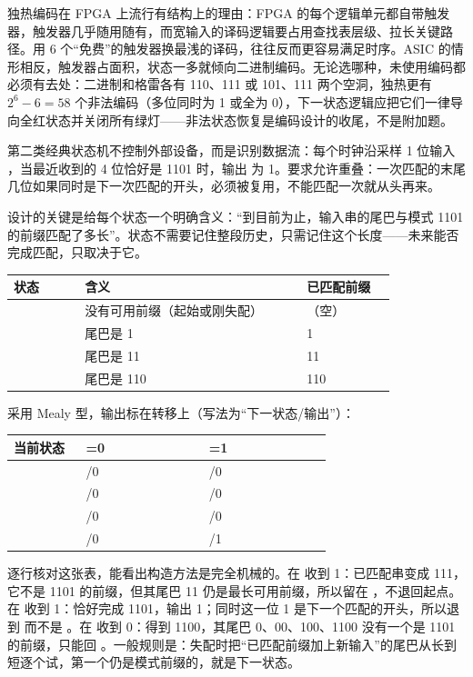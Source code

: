 独热编码在 FPGA 上流行有结构上的理由：FPGA 的每个逻辑单元都自带触发器，触发器几乎随用随有，而宽输入的译码逻辑要占用查找表层级、拉长关键路径。用 6 个“免费”的触发器换最浅的译码，往往反而更容易满足时序。ASIC 的情形相反，触发器占面积，状态一多就倾向二进制编码。无论选哪种，未使用编码都必须有去处：二进制和格雷各有 110、111 或 101、111 两个空洞，独热更有 $2^6-6=58$ 个非法编码（多位同时为 1 或全为 0），下一状态逻辑应把它们一律导向全红状态并关闭所有绿灯——非法状态恢复是编码设计的收尾，不是附加题。


第二类经典状态机不控制外部设备，而是识别数据流：每个时钟沿采样 1 位输入 ，当最近收到的 4 位恰好是 1101 时，输出  为 1。要求允许重叠：一次匹配的末尾几位如果同时是下一次匹配的开头，必须被复用，不能匹配一次就从头再来。

设计的关键是给每个状态一个明确含义：“到目前为止，输入串的尾巴与模式 1101 的前缀匹配了多长”。状态不需要记住整段历史，只需记住这个长度——未来能否完成匹配，只取决于它。

\begin{longtable}{L{0.16\linewidth}L{0.5\linewidth}L{0.2\linewidth}}
\toprule
状态 & 含义 & 已匹配前缀 \\
\midrule
{} & 没有可用前缀（起始或刚失配） & （空） \\
 & 尾巴是 1 & 1 \\
 & 尾巴是 11 & 11 \\
 & 尾巴是 110 & 110 \\
\bottomrule
\end{longtable}

采用 Mealy 型，输出标在转移上（写法为“下一状态/输出”）：

\begin{longtable}{L{0.2\linewidth}L{0.34\linewidth}L{0.34\linewidth}}
\toprule
当前状态 & =0 & =1 \\
\midrule
{} & /0 & /0 \\
 & /0 & /0 \\
 & /0 & /0 \\
 & /0 & /1 \\
\bottomrule
\end{longtable}

逐行核对这张表，能看出构造方法是完全机械的。在  收到 1：已匹配串变成 111，它不是 1101 的前缀，但其尾巴 11 仍是最长可用前缀，所以留在 ，不退回起点。在  收到 1：恰好完成 1101，输出 1；同时这一位 1 是下一个匹配的开头，所以退到  而不是 。在  收到 0：得到 1100，其尾巴 0、00、100、1100 没有一个是 1101 的前缀，只能回 。一般规则是：失配时把“已匹配前缀加上新输入”的尾巴从长到短逐个试，第一个仍是模式前缀的，就是下一状态。

